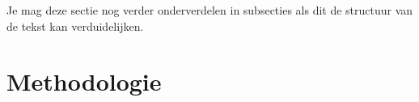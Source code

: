 







Je mag deze sectie nog verder onderverdelen in subsecties als dit de structuur van de tekst kan verduidelijken.

\section{Methodologie}%
\label{sec:methodologie}

